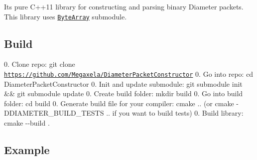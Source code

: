 It\textquotesingle{}s pure C++11 library for constructing and parsing binary Diameter packets. This library uses \href{https://github.com/Megaxela/ByteArray}{\tt Byte\+Array} submodule.

\subsection*{Build}

0. Clone repo\+: {\ttfamily git clone \href{https://github.com/Megaxela/DiameterPacketConstructor}{\tt https\+://github.\+com/\+Megaxela/\+Diameter\+Packet\+Constructor}} 0. Go into repo\+: {\ttfamily cd Diameter\+Packet\+Constructor} 0. Init and update submodule\+: {\ttfamily git submodule init \&\& git submodule update} 0. Create build folder\+: {\ttfamily mkdir build} 0. Go into build folder\+: {\ttfamily cd build} 0. Generate build file for your compiler\+: {\ttfamily cmake ..} (or {\ttfamily cmake -\/\+D\+D\+I\+A\+M\+E\+T\+E\+R\+\_\+\+B\+U\+I\+L\+D\+\_\+\+T\+E\+S\+TS ..} if you want to build tests) 0. Build library\+: {\ttfamily cmake -\/-\/build .}

\subsection*{Example}

